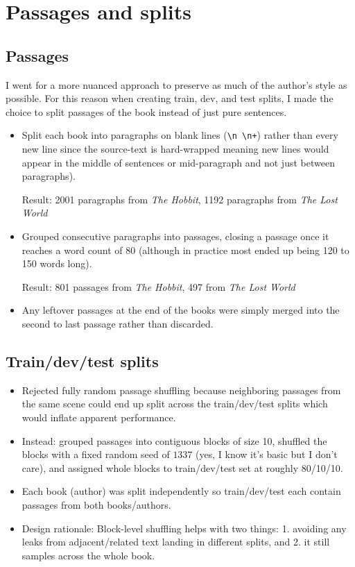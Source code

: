 \documentclass[11pt]{article}
\begin{document}
\section{Passages and splits}

\subsection{Passages}

I went for a more nuanced approach to preserve as much of the author's style as possible. For this reason when creating train, dev, and test splits, I made the choice to split passages of the book instead of just pure sentences.

\begin{itemize}
	\item Split each book into paragraphs on blank lines (\texttt{\textbackslash n \textbackslash n+}) rather than every new line since the source-text is hard-wrapped meaning new lines would appear in the middle of sentences or mid-paragraph and not just between paragraphs).

	      Result: 2001 paragraphs from \textit{The Hobbit}, 1192 paragraphs from \textit{The Lost World}

	\item Grouped consecutive paragraphs into passages, closing a passage once it reaches a word count of 80 (although in practice most ended up being 120 to 150 words long).

	      Result: 801 passages from \textit{The Hobbit}, 497 from \textit{The Lost World}

	\item Any leftover passages at the end of the books were simply merged into the second to last passage rather than discarded.

\end{itemize}

\subsection{Train/dev/test splits}

\begin{itemize}
	\item Rejected fully random passage shuffling because neighboring passages from the same scene could end up split across the train/dev/test splits which would inflate apparent performance.
	\item Instead: grouped passages into contiguous blocks of size 10, shuffled the blocks with a fixed random seed of $1337$ (yes, I know it's basic but I don't care), and assigned whole blocks to train/dev/test set at roughly 80/10/10.
	\item Each book (author) was split independently so train/dev/test each contain passages from both books/authors.
	\item Design rationale: Block-level shuffling helps with two things: 1. avoiding any leaks from adjacent/related text landing in different splits, and 2. it still samples across the whole book.
\end{itemize}
\end{document}
